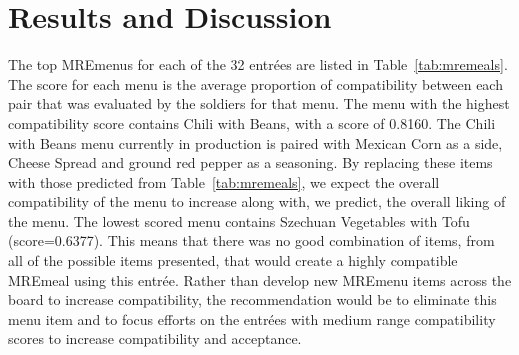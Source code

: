 \section{Results and Discussion}
The top MRE\tm menus for each of the 32 entrées are listed in Table~\ref{tab:mremeals}.  The score for each menu is the average proportion of compatibility between each pair that was evaluated by the soldiers for that menu.  The menu with the highest compatibility score contains Chili with Beans, with a score of 0.8160.  The  Chili with Beans menu currently in production is paired with Mexican Corn as a side, Cheese Spread and ground red pepper as a seasoning.  By replacing these items with those predicted from Table~\ref{tab:mremeals}, we expect the overall compatibility of the menu to increase along with, we predict, the overall liking of the menu.  The lowest scored menu contains Szechuan Vegetables with Tofu (score=0.6377).  This means that there was no good combination of items, from all of the possible items presented, that would create a highly compatible MRE\tm meal using this entrée.  Rather than develop new MRE\tm menu items across the board to increase compatibility, the recommendation would be to eliminate this menu item and to focus efforts on the entrées with medium range compatibility scores to increase compatibility and acceptance.

